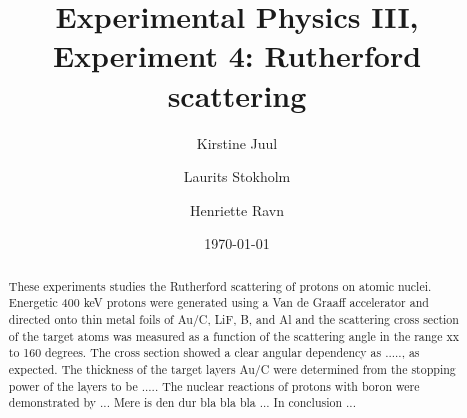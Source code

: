 \documentclass[english,a4paper,twocolumn,amsmath,amssymb,floatfix]{revtex4-1}
\begin{document}

\bigskip
\title{Experimental Physics III, Experiment 4: Rutherford scattering}

\author{Kirstine Juul} %
\author{Laurits Stokholm} %
\author{Henriette Ravn} %
\date{\today} %

\begin{abstract}
\bigskip
These experiments studies the Rutherford scattering of protons on atomic nuclei. Energetic 400 keV protons were generated using a Van de Graaff accelerator and directed onto thin metal foils of Au/C, LiF, B, and Al and the scattering cross section of the target atoms was measured as a function of the scattering angle in the range xx to 160 degrees. The cross section showed a clear angular dependency as ....., as expected. 
The thickness of the target layers Au/C were determined from the stopping power of the layers to be ..... The nuclear reactions of protons with boron were demonstrated by ... 
Mere is den dur bla bla bla ... 
In conclusion ... 
\end{abstract}

\maketitle

\noindent
\end{document}
